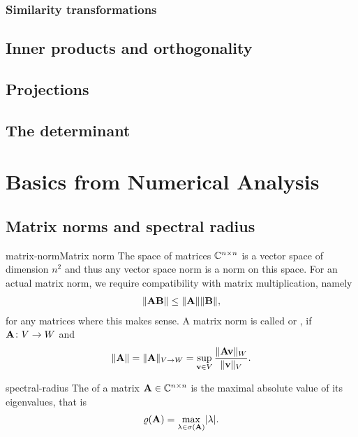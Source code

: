 \subsection{Similarity transformations}

\section{Inner products and orthogonality}

\section{Projections}

\section{The determinant}


\chapter{Basics from Numerical Analysis}


\section{Matrix norms and spectral radius}

\begin{Definition*}{matrix-norm}{Matrix norm}
  The space of matrices $\mathbb C^{n\times n}$ is a vector space of dimension $n^2$ and thus any vector space norm is a norm on this space. For an actual matrix norm, we require compatibility with matrix multiplication, namely
  \begin{gather}
    \lVert\mathbf A\mathbf B\rVert \le \lVert\mathbf A\rVert\lVert\mathbf B\rVert,
  \end{gather}
  for any matrices where this makes sense. A matrix norm is called  or , if $\mathbf A\colon V\to W$ and
  \begin{gather}
    \lVert\mathbf A\rVert = \lVert\mathbf A\rVert_{V\to W} = \sup_{\mathbf v\in V}\frac{\lVert\mathbf A\mathbf v\rVert_W}{\lVert\mathbf v\rVert_V}.
  \end{gather}
\end{Definition*}

\begin{Definition}{spectral-radius}
  The  of a matrix $\mathbf A\in\mathbb C^{n\times n}$ is the
  maximal absolute value of its eigenvalues, that is
  \begin{gather}
    \varrho(\mathbf A) = \max_{\lambda\in\sigma(\mathbf A)} \lvert\lambda\rvert.
  \end{gather}
\end{Definition}

